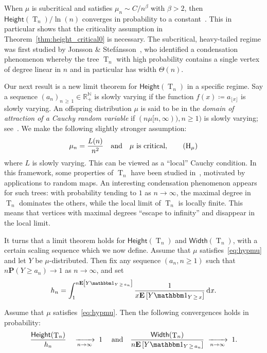 \documentclass[AHL,Unicode,longabstracts,published]{cedram}
\newcommand{\R}{\mathbb{R}}
\newcommand{\N}{\mathbb{N}}
\renewcommand{\H}{\mathsf{Height}}
\newcommand{\p}{\mathbf{P}}
\newcommand{\Width}{\mathsf{Width}}
\newcommand{\E}[1]{{\mathbf E}\left[#1\right]}
\DeclareMathOperator{\rtree}{T}
\DeclareMathOperator{\dxseq}{d\mathit{x}}
\newcommand{\I}[1]{{\mathbbm 1}_{#1}}
\newcommand{\Tn}{\rtree_{n}}
\begin{document}
When $\mu$ is subcritical and satisfies $\mu_n \sim C/n^{\beta}$ with $\beta>2$, then $\H(\Tn)/\ln(n)$ converges in probability to a constant~\cite{Kor15}. This in particular shows that the criticality assumption in Theorem~\ref{thm:height_critical0} is necessary. The subcritical, heavy-tailed regime was first studied by Jonsson \& Stefánsson~\cite{JS11}, who identified a condensation phenomenon whereby the tree $\Tn$ with high probability contains a single vertex of degree linear in $n$ and in particular has width $\Theta(n)$.


Our next result is a new limit theorem for $\H(\rtree_{n})$ in a specific regime. Say a sequence $(a_n)_{n\,\geq\,1}\in \R_{+}^{\N}$ is slowly varying if the function $f(x)\coloneqq a_{\lfloor x\rfloor}$ is slowly varying. An offspring distribution $\mu$ is said to be in the \emph{domain of attraction of a Cauchy random variable} if $(n\mu[n,\infty)),n \ge 1)$ is slowly varying; see~\cite[IX.8, Eq. (8.14)]{Fel71}. We make the following slightly stronger assumption:
\begin{equation}\label{eq:hypmu}
\mu_n= \frac{L(n)}{n^{2}} \quad \text{and} \quad \mu \text{ is critical},
\tag{$\mathrm{H}_\mu$}
\end{equation}
where $L$ is slowly varying. This can be viewed as a ``local'' Cauchy condition. In this framework, some properties of $\rtree_{n}$ have been studied in~\cite{KR19}, motivated by applications to random maps. An interesting condensation phenomenon appears for such trees: with probability tending to $1$ as $n \rightarrow \infty$, the maximal degree in $\Tn$ dominates the others, while the local limit of $\Tn$ is locally finite. This means that vertices with maximal degrees ``escape to infinity'' and disappear in the local limit.

It turns that a limit theorem holds for $\H(\rtree_{n})$ and $\Width(\rtree_{n})$, with a certain scaling sequence which we now define. Assume that $\mu$ satisfies~\eqref{eq:hypmu} and let $Y$ be $\mu$-distributed. Then fix any sequence $(a_n,n \ge 1)$ such that $n \p(Y \ge a_n) \to 1$ as $n \to \infty$, and set
\begin{equation}\label{eq:hn}
h_n = \int_1^{n \E{Y\I{Y\,\ge\,a_n}}} \frac{1}{ x \E{Y \I{Y\,\ge\,x}}} \dxseq\!.
\end{equation}
\begin{theo}\label{thm:heightCauchy0}
Assume that $\mu$ satisfies~\eqref{eq:hypmu}. Then the following convergences holds in probability:
\[
\frac{\H(\rtree_{n})}{h_{n}} \quad \xrightarrow[n\to\infty]{} \; 1 \; \quad\text{and} \quad \frac{\Width(\rtree_{n})}{n \E{Y\I{Y\,\ge\,a_n}}} \; \xrightarrow[n\to\infty]{} \; 1.
\]
\end{theo}
\end{document}
